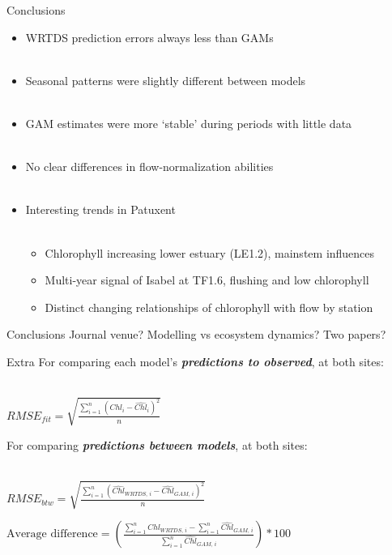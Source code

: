 \documentclass[serif]{beamer}\usepackage[]{graphicx}\usepackage[]{color}
\newcommand{\Bigtxt}[1]{\textbf{\textit{#1}}}
\begin{document}
\begin{frame}{Conclusions}
\begin{itemize}
\item WRTDS prediction errors always less than GAMs \\~\\
\item Seasonal patterns were slightly different between models \\~\\
\item GAM estimates were more `stable' during periods with little data \\~\\
\item No clear differences in flow-normalization abilities \\~\\
\item Interesting trends in Patuxent \\~\\
\begin{itemize}
\item Chlorophyll increasing lower estuary (LE1.2), mainstem influences
\item Multi-year signal of Isabel at TF1.6, flushing and low chlorophyll
\item Distinct changing relationships of chlorophyll with flow by station
\end{itemize}
\end{itemize}
\end{frame}

\begin{frame}{Conclusions}
Journal venue?  Modelling vs ecosystem dynamics? Two papers?
\end{frame}

\begin{frame}{Extra}
For comparing each model's \Bigtxt{predictions to observed}, at both sites:\\~\\
\begin{center}
$RMSE_{fit} = \sqrt {\frac{{\sum\limits_{{i = 1}}^n {{{\left( {{Chl_i} - {\widehat{Chl}_i}} \right)}^2}} }}{n}}$
\end{center}
For comparing \Bigtxt{predictions between models}, at both sites: \\~\\
\begin{center} 
$RMSE_{btw} = \sqrt {\frac{{\sum\limits_{{i = 1}}^n {{{\left( {{\widehat{Chl}_{WRTDS,\,i}} - {{\widehat{Chl}}_{GAM,\,i}}} \right)}^2}} }}{n}}$
\end{center}
\begin{center}
$\textrm{Average difference} = \left(\frac{\sum\limits_{i = 1}^n \widehat{Chl}_{WRTDS,\,i} - \sum\limits_{i = 1}^n \widehat{Chl}_{GAM,\,i}}{\sum\limits_{i = 1}^n \widehat{Chl}_{GAM,\,i}}\right) * 100$
\end{center}
\end{frame}
\end{document}
